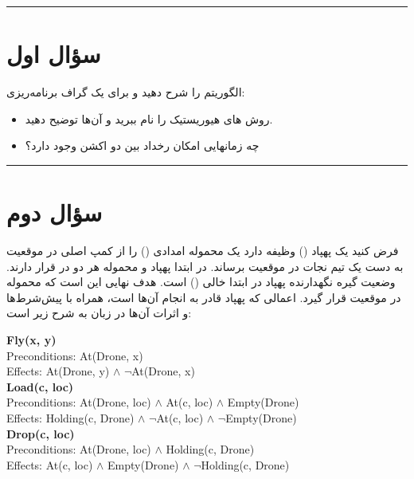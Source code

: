 \documentclass[a4paper,10pt]{article}
\begin{document}
	
	\vspace{8pt}
	\textcolor{AccentCyan}{\rule{\linewidth}{0.8pt}}
	\section{\textcolor{AccentGold}{سؤال اول}}
	
	الگوریتم  را شرح دهید و برای یک گراف برنامه‌ریزی:
	
	\begin{itemize}
		\item[الف)] روش های هیوریستیک را نام ببرید و آن‌ها توضیح دهید.
		\item[ب)] چه زمانهایی امکان رخداد  بین دو اکشن وجود دارد؟
	\end{itemize}
	
	\bigskip
	\bigskip
	\textcolor{AccentCyan}{\rule{\linewidth}{0.4pt}}
	\section{\textcolor{AccentGold}{سؤال دوم}}
	
	فرض کنید یک پهپاد () وظیفه دارد یک محموله امدادی () را از کمپ اصلی در موقعیت  به دست یک تیم نجات در موقعیت  برساند. در ابتدا پهپاد و محموله هر دو در  قرار دارند. وضعیت گیره نگهدارنده پهپاد در ابتدا خالی () است. هدف نهایی این است که محموله در موقعیت  قرار گیرد. اعمالی که پهپاد قادر به انجام آن‌ها است، همراه با پیش‌شرط‌ها و اثرات آن‌ها در زبان  به شرح زیر است:
	
	\vspace{1em}
	\begin{latin}
		\textbf{Fly(x, y)}\\
		Preconditions: At(Drone, x)\\
		Effects: At(Drone, y) $\land$ $\neg$At(Drone, x)\\[1em]
		
		\textbf{Load(c, loc)}\\
		Preconditions: At(Drone, loc) $\land$ At(c, loc) $\land$ Empty(Drone)\\
		Effects: Holding(c, Drone) $\land$ $\neg$At(c, loc) $\land$ $\neg$Empty(Drone)\\[1em]
		
		\textbf{Drop(c, loc)}\\
		Preconditions: At(Drone, loc) $\land$ Holding(c, Drone)\\
		Effects: At(c, loc) $\land$ Empty(Drone) $\land$ $\neg$Holding(c, Drone)
	\end{latin}
	\vspace{1em}
	
\end{document}
